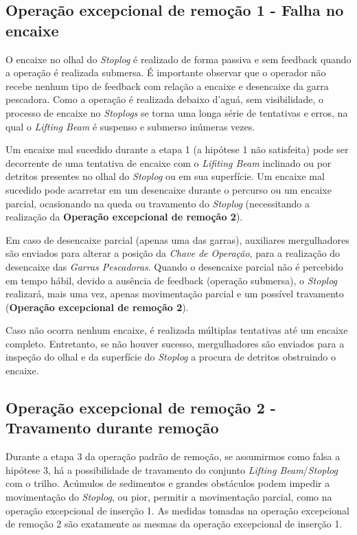 \subsection{Operação excepcional de remoção 1 - Falha no encaixe}
\label{op:rem:1}
O encaixe no olhal do \emph{Stoplog} é realizado de forma passiva e sem feedback
quando a operação é realizada submersa. É importante observar que o operador não
recebe nenhum tipo de feedback com relação a encaixe e desencaixe da garra
pescadora. Como a operação é realizada debaixo d'aguá, sem visibilidade, o
processo de encaixe no \emph{Stoplogs} se torna uma longa série de tentativas e
erros, na qual o \emph{Lifting Beam} é suspenso e submerso inúmeras vezes.

Um encaixe mal sucedido durante a etapa 1 (a hipótese 1 não satisfeita) pode ser
decorrente de uma tentativa de encaixe com o \emph{Lifiting Beam} inclinado ou
por detritos presentes no olhal do \emph{Stoplog} ou em sua superfície. Um
encaixe mal sucedido pode acarretar em um desencaixe durante o percurso ou um
encaixe parcial, ocasionando na queda ou travamento do \emph{Stoplog}
(necessitando a realização da \textbf{Operação excepcional de remoção 2}).

Em caso de desencaixe parcial (apenas uma das garras), auxiliares mergulhadores
são enviados para alterar a posição da \emph{Chave de Operação}, para a
realização do desencaixe das \emph{Garras Pescadoras}. Quando o desencaixe
parcial não é percebido em tempo hábil, devido a ausência de feedback (operação
submersa), o \emph{Stoplog} realizará, mais uma vez, apenas movimentação parcial
e um possível travamento (\textbf{Operação excepcional de remoção 2}).

Caso não ocorra nenhum encaixe, é realizada múltiplas tentativas até um encaixe
completo. Entretanto, se não houver sucesso, mergulhadores são enviados para a
inspeção do olhal e da superfície do \emph{Stoplog} a procura de detritos
obstruindo o encaixe.

\subsection{Operação excepcional de remoção 2 - Travamento durante remoção}
\label{op:rem:2}
Durante a etapa 3 da operação padrão de remoção, se assumirmos como falsa a
hipótese 3, há a possibilidade de travamento do conjunto \emph{Lifting
Beam}/\emph{Stoplog} com o trilho. Acúmulos de sedimentos e grandes obstáculos
podem impedir a movimentação do \emph{Stoplog}, ou pior, permitir a movimentação
parcial, como na operação excepcional de inserção 1. As medidas tomadas na
operação excepcional de remoção 2 são exatamente as mesmas da operação
excepcional de inserção 1.

